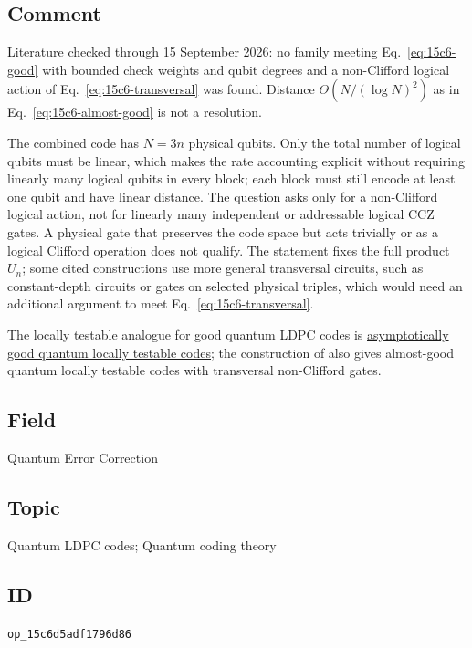 \subsection*{Comment}

Literature checked through 15 September 2026: no family meeting
Eq.~\eqref{eq:15c6-good} with bounded check weights and qubit degrees and a
non-Clifford logical action of Eq.~\eqref{eq:15c6-transversal} was found.
Distance $\Theta(N/(\log N)^2)$ as in Eq.~\eqref{eq:15c6-almost-good} is not
a resolution.

The combined code has $N=3n$ physical qubits.  Only the total number of
logical qubits must be linear, which makes the rate accounting explicit
without requiring linearly many logical qubits in every block; each block must
still encode at least one qubit and have linear distance.  The question asks
only for a non-Clifford logical action, not for linearly many independent or
addressable logical CCZ gates.  A physical gate that preserves the code space
but acts trivially or as a logical Clifford operation does not qualify.  The
statement fixes the full product $U_n$; some cited constructions use more
general transversal circuits, such as constant-depth circuits or gates on
selected physical triples, which would need an additional argument to meet
Eq.~\eqref{eq:15c6-transversal}.

The locally testable analogue for good quantum LDPC codes is
\href{https://qiqc-op.com/problem/op_0c091a6b5a55a8fd/}{asymptotically good
quantum locally testable codes}; the construction of
 also gives almost-good quantum locally
testable codes with transversal non-Clifford gates.

\subsection*{Field}

Quantum Error Correction

\subsection*{Topic}

Quantum LDPC codes; Quantum coding theory

\subsection*{ID}

\texttt{op\_15c6d5adf1796d86}
